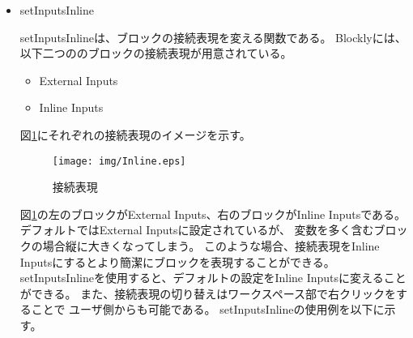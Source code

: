 \documentclass{risepaper}
\begin{document}
\begin{itemize}
\item setInputsInline

setInputsInlineは、ブロックの接続表現を変える関数である。
Blocklyには、以下二つののブロックの接続表現が用意されている。
\begin{itemize}
\item External Inputs
\item Inline Inputs
\end{itemize}

図\ref{fig:Inline}にそれぞれの接続表現のイメージを示す。

\begin{figure}[h]
\begin{center}
\texttt{[image: img/Inline.eps]}
\caption{接続表現}%
\label{fig:Inline}
\end{center}%
\end{figure}%

図\ref{fig:Inline}の左のブロックがExternal Inputs、右のブロックがInline Inputsである。
デフォルトではExternal Inputsに設定されているが、
変数を多く含むブロックの場合縦に大きくなってしまう。
このような場合、接続表現をInline Inputsにするとより簡潔にブロックを表現することができる。
setInputsInlineを使用すると、デフォルトの設定をInline Inputsに変えることができる。
また、接続表現の切り替えはワークスペース部で右クリックをすることで
ユーザ側からも可能である。
setInputsInlineの使用例を以下に示す。


\end{itemize}
\end{document}
